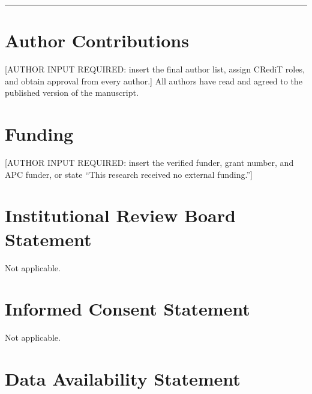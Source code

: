 \documentclass[energies,article,submit,moreauthors]{Definitions/mdpi}
\begin{document}
\begin{center}\rule{0.5\linewidth}{0.5pt}\end{center}

\section*{Author Contributions}

{[}AUTHOR INPUT REQUIRED: insert the final author list, assign CRediT roles, and obtain approval from every author.{]} All authors have read and agreed to the published version of the manuscript.

\section*{Funding}

{[}AUTHOR INPUT REQUIRED: insert the verified funder, grant number, and APC funder, or state ``This research received no external funding.''{]}

\section*{Institutional Review Board Statement}

Not applicable.

\section*{Informed Consent Statement}

Not applicable.

\section*{Data Availability Statement}
\end{document}
